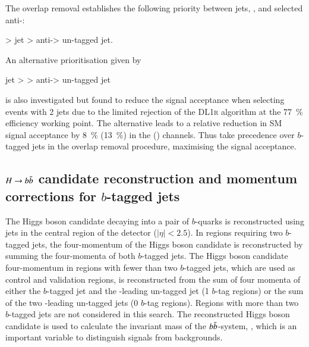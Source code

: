The overlap removal establishes the following priority between jets,
\tauhadvis, and selected anti-\tauhadvis:
\begin{center}
  \tauhadvis > \btagged jet > anti-\tauhadvis > un-tagged jet.
\end{center}
An alternative prioritisation given by
\begin{center}
  \btagged jet > \tauhadvis > anti-\tauhadvis > un-tagged jet
\end{center}
is also investigated but found to reduce the signal acceptance when
selecting events with 2 \btagged jets due to the limited \tauhadvis
rejection of the \textsc{DL1r} \btag algorithm at the
\SI{77}{\percent} efficiency working point. The alternative leads to a
relative reduction in SM \HH signal acceptance by \SI{8}{\percent}
(\SI{13}{\percent}) in the \lephad (\hadhad) channels. Thus \tauhadvis
take precedence over $b$-tagged jets in the overlap removal procedure,
maximising the signal acceptance.



\subsection{$H \to b\bar{b}$ candidate reconstruction and momentum
  corrections for $b$-tagged jets}%
\label{sec:hbb_reco}%
\label{sec:bjet_momentum_corrections}

The Higgs boson candidate decaying into a pair of $b$-quarks is
reconstructed using jets in the central region of the detector
($|\eta| < 2.5$). In regions requiring two $b$-tagged jets, the
four-momentum of the Higgs boson candidate is reconstructed by summing
the four-momenta of both $b$-tagged jets. The Higgs boson candidate
four-momentum in regions with fewer than two $b$-tagged jets, which
are used as control and validation regions, is reconstructed from the
sum of four momenta of either the $b$-tagged jet and the \pT-leading
un-tagged jet (1 $b$-tag regions) or the sum of the two \pT-leading
un-tagged jets (0 $b$-tag regions). Regions with more than two
$b$-tagged jets are not considered in this search. The reconstructed
Higgs boson candidate is used to calculate the invariant mass of the
$b\bar{b}$-system, \mBB, which is an important variable to distinguish
signals from backgrounds.

